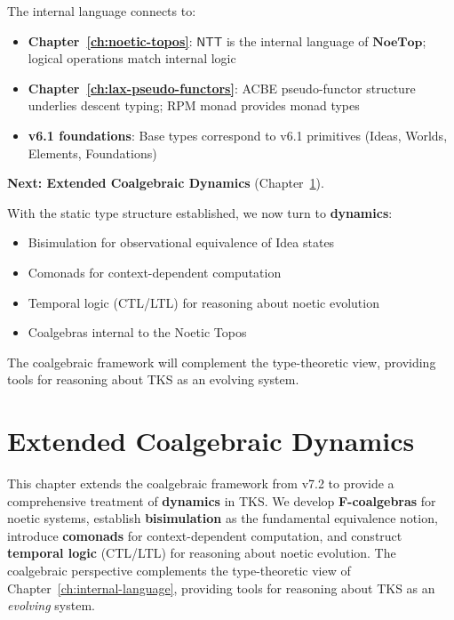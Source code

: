 \begin{remark}
The internal language connects to:
\begin{itemize}
  \item \textbf{Chapter~\ref{ch:noetic-topos}}: $\mathsf{NTT}$ is the internal
        language of $\mathbf{NoeTop}$; logical operations match internal logic
  \item \textbf{Chapter~\ref{ch:lax-pseudo-functors}}: ACBE pseudo-functor
        structure underlies descent typing; RPM monad provides monad types
  \item \textbf{v6.1 foundations}: Base types correspond to v6.1 primitives
        (Ideas, Worlds, Elements, Foundations)
\end{itemize}
\end{remark}

\begin{remark}
\textbf{Next: Extended Coalgebraic Dynamics} (Chapter~\ref{ch:extended-coalgebra}).

With the static type structure established, we now turn to \textbf{dynamics}:
\begin{itemize}
  \item Bisimulation for observational equivalence of Idea states
  \item Comonads for context-dependent computation
  \item Temporal logic (CTL/LTL) for reasoning about noetic evolution
  \item Coalgebras internal to the Noetic Topos
\end{itemize}
The coalgebraic framework will complement the type-theoretic view, providing
tools for reasoning about TKS as an evolving system.
\end{remark}

\chapter{Extended Coalgebraic Dynamics}
\label{ch:extended-coalgebra}

\begin{tcolorbox}[colback=blue!5!white,colframe=blue!75!black,title=\vnewthree]
This chapter extends the coalgebraic framework from v7.2 to provide a comprehensive
treatment of \textbf{dynamics} in TKS. We develop \textbf{F-coalgebras} for noetic
systems, establish \textbf{bisimulation} as the fundamental equivalence notion,
introduce \textbf{comonads} for context-dependent computation, and construct
\textbf{temporal logic} (CTL/LTL) for reasoning about noetic evolution. The
coalgebraic perspective complements the type-theoretic view of Chapter~\ref{ch:internal-language},
providing tools for reasoning about TKS as an \emph{evolving} system.
\end{tcolorbox}

